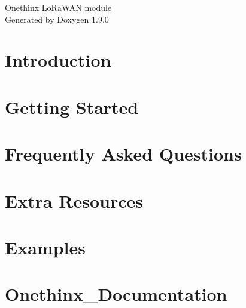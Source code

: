 \let\mypdfximage\pdfximage\def\pdfximage{\immediate\mypdfximage}\documentclass[twoside]{book}
\newcommand{\+}{\discretionary{\mbox{\scriptsize$\hookleftarrow$}}{}{}}
\newcommand{\clearemptydoublepage}{%
  \newpage{\pagestyle{empty}\cleardoublepage}%
}
\begin{document}
\raggedbottom

\hypersetup{pageanchor=false,
             bookmarksnumbered=true,
             pdfencoding=unicode
            }
\begin{titlepage}
\vspace*{7cm}
\begin{center}%
{\Large Onethinx Lo\+Ra\+WAN module }\\
\vspace*{1cm}
{\large Generated by Doxygen 1.9.0}\\
\end{center}
\end{titlepage}
\clearemptydoublepage
{}
\tableofcontents
\clearemptydoublepage
{}
\hypersetup{pageanchor=true}

\chapter{Introduction}
\label{intro}

\chapter{Getting Started}
\label{getstart}

\chapter{Frequently Asked Questions}
\label{_f_a_q}

\chapter{Extra Resources}
\label{extra_resources}

\chapter{Examples}
\label{ex_examples}

\chapter{Onethinx\+\_\+\+Documentation}
\label{md__c___onethinx__tomislav__core_module_files__documentation__onethinx__documentation__r_e_a_d_m_e}

\end{document}

